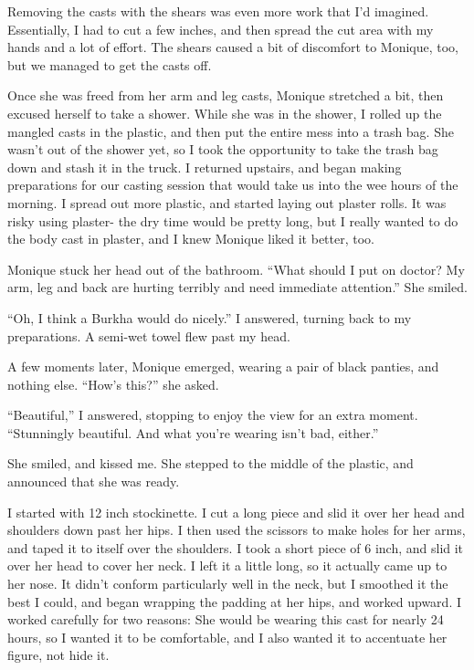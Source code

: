 Removing the casts with the shears was even more work that I'd imagined. Essentially, I had
to cut a few inches, and then spread the cut area with my hands and a lot of effort. The shears
caused a bit of discomfort to Monique, too, but we managed to get the casts off.

Once she was freed from her arm and leg casts, Monique stretched a bit, then excused
herself to take a shower. While she was in the shower, I rolled up the mangled casts in the
plastic, and then put the entire mess into a trash bag. She wasn't out of the shower yet, so I
took the opportunity to take the trash bag down and stash it in the truck. I returned upstairs,
and began making preparations for our casting session that would take us into the wee hours of
the morning. I spread out more plastic, and started laying out plaster rolls. It was risky using
plaster- the dry time would be pretty long, but I really wanted to do the body cast in plaster,
and I knew Monique liked it better, too.

Monique stuck her head out of the bathroom. ``What should I put on doctor? My arm, leg and
back are hurting terribly and need immediate attention.'' She smiled.

``Oh, I think a Burkha would do nicely.'' I answered, turning back to my preparations. A
semi-wet towel flew past my head.

A few moments later, Monique emerged, wearing a pair of black panties, and nothing else.
``How's this?'' she asked.

``Beautiful,'' I answered, stopping to enjoy the view for an extra moment. ``Stunningly
beautiful. And what you're wearing isn't bad, either.''

She smiled, and kissed me. She stepped to the middle of the plastic, and announced that she
was ready.

I started with 12 inch stockinette. I cut a long piece and slid it over her head and
shoulders down past her hips. I then used the scissors to make holes for her arms, and taped it
to itself over the shoulders. I took a short piece of 6 inch, and slid it over her head to cover
her neck. I left it a little long, so it actually came up to her nose. It didn't conform
particularly well in the neck, but I smoothed it the best I could, and began wrapping the
padding at her hips, and worked upward. I worked carefully for two reasons: She would be wearing
this cast for nearly 24 hours, so I wanted it to be comfortable, and I also wanted it to
accentuate her figure, not hide it.

